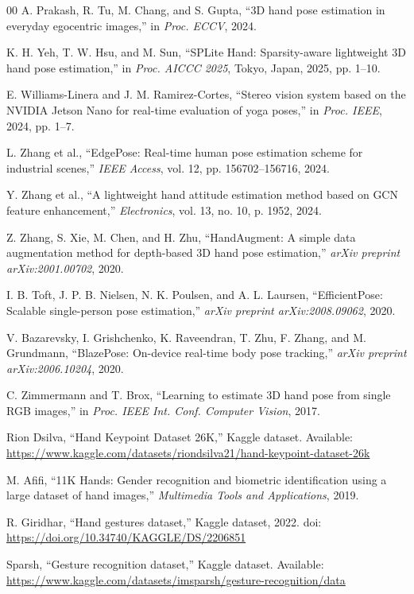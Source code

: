 ﻿\documentclass[10pt,letterpaper]{article}
\begin{document}
\begin{thebibliography}{00}
A. Prakash, R. Tu, M. Chang, and S. Gupta, ``3D hand pose estimation in everyday egocentric images,'' in \emph{Proc. ECCV}, 2024.

K. H. Yeh, T. W. Hsu, and M. Sun, ``SPLite Hand: Sparsity-aware lightweight 3D hand pose estimation,'' in \emph{Proc. AICCC 2025}, Tokyo, Japan, 2025, pp. 1--10.

E. Williams-Linera and J. M. Ramirez-Cortes, ``Stereo vision system based on the NVIDIA Jetson Nano for real-time evaluation of yoga poses,'' in \emph{Proc. IEEE}, 2024, pp. 1--7.

L. Zhang et al., ``EdgePose: Real-time human pose estimation scheme for industrial scenes,'' \emph{IEEE Access}, vol. 12, pp. 156702--156716, 2024.

Y. Zhang et al., ``A lightweight hand attitude estimation method based on GCN feature enhancement,'' \emph{Electronics}, vol. 13, no. 10, p. 1952, 2024.

Z. Zhang, S. Xie, M. Chen, and H. Zhu, ``HandAugment: A simple data augmentation method for depth-based 3D hand pose estimation,'' \emph{arXiv preprint arXiv:2001.00702}, 2020.

I. B. Toft, J. P. B. Nielsen, N. K. Poulsen, and A. L. Laursen, ``EfficientPose: Scalable single-person pose estimation,'' \emph{arXiv preprint arXiv:2008.09062}, 2020.

V. Bazarevsky, I. Grishchenko, K. Raveendran, T. Zhu, F. Zhang, and M. Grundmann, ``BlazePose: On-device real-time body pose tracking,'' \emph{arXiv preprint arXiv:2006.10204}, 2020.

C. Zimmermann and T. Brox, ``Learning to estimate 3D hand pose from single RGB images,'' in \emph{Proc. IEEE Int. Conf. Computer Vision}, 2017.

Rion Dsilva, ``Hand Keypoint Dataset 26K,'' Kaggle dataset. Available: \url{https://www.kaggle.com/datasets/riondsilva21/hand-keypoint-dataset-26k}

M. Afifi, ``11K Hands: Gender recognition and biometric identification using a large dataset of hand images,'' \emph{Multimedia Tools and Applications}, 2019.

R. Giridhar, ``Hand gestures dataset,'' Kaggle dataset, 2022. doi: \url{https://doi.org/10.34740/KAGGLE/DS/2206851}

Sparsh, ``Gesture recognition dataset,'' Kaggle dataset. Available: \url{https://www.kaggle.com/datasets/imsparsh/gesture-recognition/data}

\end{thebibliography}
\end{document}
